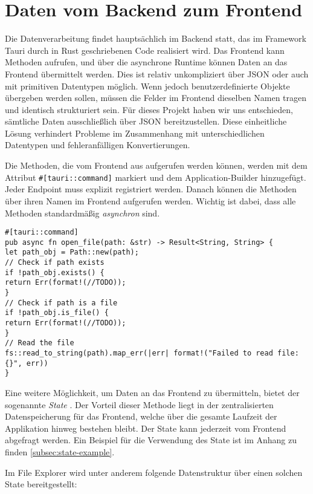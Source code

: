 \section{Daten vom Backend zum Frontend}

Die Datenverarbeitung findet hauptsächlich im Backend statt, das im Framework Tauri \cite{tauri2025} durch in Rust geschriebenen
Code realisiert wird. Das Frontend kann Methoden aufrufen, und über die asynchrone Runtime können Daten an das Frontend
übermittelt werden. Dies ist relativ unkompliziert über JSON oder auch mit primitiven Datentypen möglich. Wenn jedoch
benutzerdefinierte Objekte übergeben werden sollen, müssen die Felder im Frontend dieselben Namen tragen und identisch
strukturiert sein. Für dieses Projekt haben wir uns entschieden, sämtliche Daten ausschließlich über JSON bereitzustellen. Diese
einheitliche Lösung verhindert Probleme im Zusammenhang mit unterschiedlichen Datentypen und fehleranfälligen Konvertierungen.

Die Methoden, die vom Frontend aus aufgerufen werden können, werden mit dem Attribut \verb|#[tauri::command]| markiert und dem
Application-Builder hinzugefügt. Jeder Endpoint muss explizit registriert werden. Danach können die Methoden über ihren Namen im
Frontend aufgerufen werden. Wichtig ist dabei, dass alle Methoden standardmäßig \textit{asynchron} sind.

\begin{verbatim}
#[tauri::command]
pub async fn open_file(path: &str) -> Result<String, String> {
let path_obj = Path::new(path);
// Check if path exists
if !path_obj.exists() {
return Err(format!(//TODO));
}
// Check if path is a file
if !path_obj.is_file() {
return Err(format!(//TODO));
}
// Read the file
fs::read_to_string(path).map_err(|err| format!("Failed to read file: {}", err))
}
\end{verbatim}

Eine weitere Möglichkeit, um Daten an das Frontend zu übermitteln, bietet der sogenannte \textit{State}
\cite{tauri_state_management}. Der Vorteil dieser Methode liegt in der zentralisierten Datenspeicherung für das Frontend, welche
über die gesamte Laufzeit der Applikation hinweg bestehen bleibt. Der State kann jederzeit vom Frontend abgefragt werden. Ein
Beispiel für die Verwendung des State ist im Anhang zu finden \ref{subsec:state-example}.

Im File Explorer wird unter anderem folgende Datenstruktur über einen solchen State bereitgestellt:

\newpage


